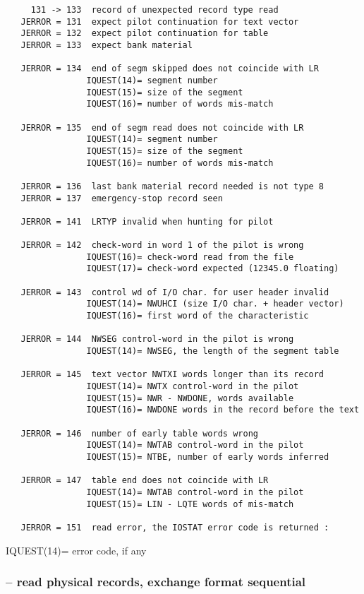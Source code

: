\begin{verbatim}
     131 -> 133  record of unexpected record type read
   JERROR = 131  expect pilot continuation for text vector
   JERROR = 132  expect pilot continuation for table
   JERROR = 133  expect bank material

   JERROR = 134  end of segm skipped does not coincide with LR
                IQUEST(14)= segment number
                IQUEST(15)= size of the segment
                IQUEST(16)= number of words mis-match

   JERROR = 135  end of segm read does not coincide with LR
                IQUEST(14)= segment number
                IQUEST(15)= size of the segment
                IQUEST(16)= number of words mis-match

   JERROR = 136  last bank material record needed is not type 8
   JERROR = 137  emergency-stop record seen

   JERROR = 141  LRTYP invalid when hunting for pilot

   JERROR = 142  check-word in word 1 of the pilot is wrong
                IQUEST(16)= check-word read from the file
                IQUEST(17)= check-word expected (12345.0 floating)

   JERROR = 143  control wd of I/O char. for user header invalid
                IQUEST(14)= NWUHCI (size I/O char. + header vector)
                IQUEST(16)= first word of the characteristic

   JERROR = 144  NWSEG control-word in the pilot is wrong
                IQUEST(14)= NWSEG, the length of the segment table

   JERROR = 145  text vector NWTXI words longer than its record
                IQUEST(14)= NWTX control-word in the pilot
                IQUEST(15)= NWR - NWDONE, words available
                IQUEST(16)= NWDONE words in the record before the text

   JERROR = 146  number of early table words wrong
                IQUEST(14)= NWTAB control-word in the pilot
                IQUEST(15)= NTBE, number of early words inferred

   JERROR = 147  table end does not coincide with LR
                IQUEST(14)= NWTAB control-word in the pilot
                IQUEST(15)= LIN - LQTE words of mis-match

   JERROR = 151  read error, the IOSTAT error code is returned :
\end{verbatim}
                IQUEST(14)= error code, if any

\subsubsection*{ -- read physical records, exchange format sequential}

